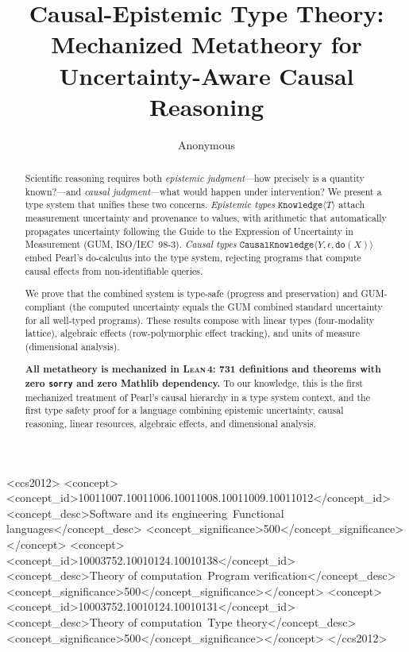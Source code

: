 \documentclass[acmsmall,screen,review,anonymous]{acmart}
\newcommand{\know}[1]{\texttt{Knowledge}\langle #1 \rangle}
\newcommand{\cknow}[3]{\texttt{CausalKnowledge}\langle #1, #2, #3 \rangle}
\newcommand{\eps}{\epsilon}
\newcommand{\lean}{\textsc{Lean\,4}\xspace}
\begin{document}
\title{Causal-Epistemic Type Theory: \\
Mechanized Metatheory for Uncertainty-Aware Causal Reasoning}

\author{Anonymous}

\begin{abstract}
Scientific reasoning requires both \emph{epistemic judgment}---how
precisely is a quantity known?---and \emph{causal judgment}---what
would happen under intervention?
We present a type system that unifies these two concerns.
\emph{Epistemic types} $\know{T}$ attach measurement uncertainty and
provenance to values, with arithmetic that automatically propagates
uncertainty following the Guide to the Expression of Uncertainty in
Measurement (GUM, ISO/IEC~98-3).
\emph{Causal types} $\cknow{Y}{\eps}{\texttt{do}(X)}$ embed Pearl's
do-calculus into the type system, rejecting programs that compute
causal effects from non-identifiable queries.

We prove that the combined system is type-safe (progress and
preservation) and GUM-compliant (the computed uncertainty equals the
GUM combined standard uncertainty for all well-typed programs).
These results compose with linear types (four-modality lattice),
algebraic effects (row-polymorphic effect tracking), and units of
measure (dimensional analysis).

\textbf{All metatheory is mechanized in \lean: 731 definitions and
theorems with zero \texttt{sorry} and zero Mathlib dependency.}
To our knowledge, this is the first mechanized treatment of
Pearl's causal hierarchy in a type system context, and the first
type safety proof for a language combining epistemic uncertainty,
causal reasoning, linear resources, algebraic effects, and
dimensional analysis.
\end{abstract}

\begin{CCSXML}
<ccs2012>
<concept><concept_id>10011007.10011006.10011008.10011009.10011012</concept_id>
<concept_desc>Software and its engineering~Functional languages</concept_desc>
<concept_significance>500</concept_significance></concept>
<concept><concept_id>10003752.10010124.10010138</concept_id>
<concept_desc>Theory of computation~Program verification</concept_desc>
<concept_significance>500</concept_significance></concept>
<concept><concept_id>10003752.10010124.10010131</concept_id>
<concept_desc>Theory of computation~Type theory</concept_desc>
<concept_significance>500</concept_significance></concept>
</ccs2012>
\end{CCSXML}
\end{document}
